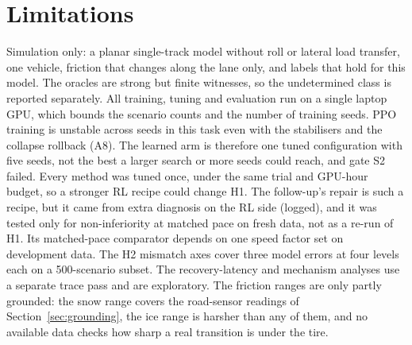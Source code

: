 \documentclass[11pt]{article}
\begin{document}
\section{Limitations}
Simulation only: a planar single-track model without roll or lateral load transfer, one vehicle, friction that
changes along the lane only, and labels that hold for this model. The oracles are strong but finite witnesses, so the
undetermined class is reported separately. All training, tuning and evaluation run on a single laptop GPU, which
bounds the scenario counts and the number of training seeds. PPO training is unstable across seeds in this task even with
the stabilisers and the collapse rollback (A8). The learned arm is therefore one tuned configuration with five
seeds, not the best a larger search or more seeds could reach, and gate S2 failed. Every method was tuned once,
under the same trial and GPU-hour budget, so a stronger RL recipe could change H1. The follow-up's repair is such a
recipe, but it came from extra diagnosis on the RL side (logged), and it was tested only for non-inferiority at
matched pace on fresh data, not as a re-run of H1. Its matched-pace comparator depends on one speed factor set on
development data. The H2 mismatch axes cover three
model errors at four levels each on a 500-scenario subset. The recovery-latency and mechanism analyses use a
separate trace pass and are exploratory. The friction ranges are only partly grounded: the snow range covers the
road-sensor readings of Section~\ref{sec:grounding}, the ice range is harsher than any of them, and no available
data checks how sharp a real transition is under the tire.



\end{document}
